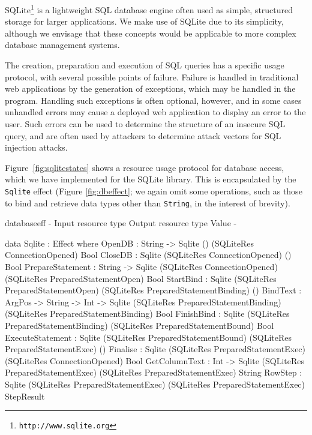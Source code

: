 SQLite\footnote{\texttt{http://www.sqlite.org}} is a lightweight SQL database engine often used as simple, structured storage for larger applications. We make use of SQLite due to its simplicity, although we envisage that these concepts would be applicable to more complex database management systems. 

The creation, preparation and execution of SQL queries has a specific usage protocol, with several possible points of failure. Failure is handled in traditional web applications by the generation of exceptions, which may be handled in the program.
Handling such exceptions is often optional, however, and in some cases unhandled errors may cause a deployed web application to display an error to the user. Such errors can be used to determine the structure of an insecure SQL query, and are often used by attackers to determine attack vectors for SQL injection attacks.

Figure~\ref{fig:sqlitestates} shows a resource usage protocol for database
access, which we have implemented for the SQLite library. This is encapsulated
by the \texttt{Sqlite} effect (Figure \ref{fig:dbeffect}; we again omit some operations, such as those to
bind and retrieve data types other than \texttt{String}, in the interest of
brevity).

\begin{SaveVerbatim}{databaseeff}
{-                   { Input resource type }                     { Output resource type }             { Value } -}

data Sqlite : Effect where
  OpenDB           : String -> 
                     Sqlite ()                                   (SQLiteRes ConnectionOpened)         Bool
  CloseDB          : Sqlite (SQLiteRes ConnectionOpened)         ()                                   Bool
  PrepareStatement : String -> 
                     Sqlite (SQLiteRes ConnectionOpened)         (SQLiteRes PreparedStatementOpen)    Bool
  StartBind        : Sqlite (SQLiteRes PreparedStatementOpen)    (SQLiteRes PreparedStatementBinding) ()
  BindText         : ArgPos -> String -> Int -> 
                     Sqlite (SQLiteRes PreparedStatementBinding) (SQLiteRes PreparedStatementBinding) Bool
  FinishBind       : Sqlite (SQLiteRes PreparedStatementBinding) (SQLiteRes PreparedStatementBound)   Bool
  ExecuteStatement : Sqlite (SQLiteRes PreparedStatementBound)   (SQLiteRes PreparedStatementExec)    ()
  Finalise         : Sqlite (SQLiteRes PreparedStatementExec)    (SQLiteRes ConnectionOpened)         Bool
  GetColumnText    : Int -> 
                     Sqlite (SQLiteRes PreparedStatementExec)    (SQLiteRes PreparedStatementExec)    String
  RowStep          : Sqlite (SQLiteRes PreparedStatementExec)    (SQLiteRes PreparedStatementExec)    StepResult
\end{SaveVerbatim}

